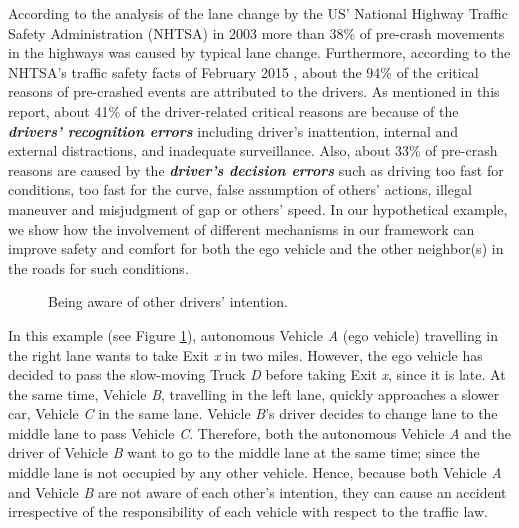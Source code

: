 \documentclass[journal, 11pt]{IEEEtran}
\begin{document}
According to the analysis of the lane change by the US' National Highway Traffic
Safety Administration (NHTSA) in 2003 \cite{nhtsa:lane-change} more than
38\% of pre-crash movements in the highways was caused by typical lane change.
Furthermore, according to the NHTSA's traffic safety facts of February 2015
\cite{nhtsa:crash-stats}, about the 94\% of the critical reasons of
pre-crashed events are attributed to the drivers. As mentioned in this report,
about 41\% of the driver-related critical reasons are because of the
\textit{\textbf{drivers' recognition errors}} including driver’s inattention,
internal and external distractions, and inadequate surveillance. Also, about
33\% of pre-crash reasons are caused by the \textit{\textbf{driver's decision
errors}} such as driving too fast for conditions, too fast for the curve, false
assumption of others’ actions, illegal maneuver and misjudgment of gap or
others’ speed. In our hypothetical example, we show how the involvement of
different mechanisms in our framework can improve safety and comfort for both
the ego vehicle and the other neighbor(s) in the roads for such conditions.

\begin{figure}[!t]
  \centerline{}
  \vspace*{-2mm}
  \caption{Being aware of other drivers' intention.}
  \label{fig:example1}
  \vspace*{-5mm}
\end{figure}

In this example (see Figure \ref{fig:example1}), autonomous Vehicle
\textit{A} (ego vehicle) travelling in the right lane wants to take Exit
\textit{x} in two miles. However, the ego vehicle has decided to pass the
slow-moving Truck \textit{D} before taking Exit \textit{x}, since it is late. At
the same time, Vehicle \textit{B}, travelling in the left lane, quickly
approaches a slower car, Vehicle \textit{C} in the same lane. Vehicle
\textit{B}'s driver decides to change lane to the middle lane to pass Vehicle
\textit{C}. Therefore, both the autonomous Vehicle \textit{A} and the driver of
Vehicle \textit{B} want to go to the middle lane at the same time; since the
middle lane is not occupied by any other vehicle. Hence, because both Vehicle
\textit{A} and Vehicle \textit{B} are not aware of each other's intention, they
can cause an accident irrespective of the responsibility of each vehicle with
respect to the traffic law.
\end{document}
